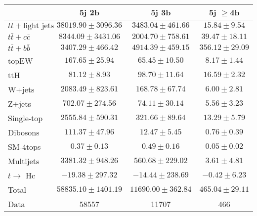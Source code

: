 \begin{table}
\begin{center}
  \begin{tabular}{ | l |  c |  c |  c | }
    \hline \hline 
     & 5j 2b  & 5j 3b  & 5j $\geq$4b  \\ 
    \hline 
     $t\bar{t}+\text{light jets}$  &   $ 38019.90 \pm 3096.36 $ &   $ 3483.04 \pm 461.66 $ &   $ 15.84 \pm 9.54 $ \\ 
     $t\bar{t}+c\bar{c}$  &   $ 8344.09 \pm 3431.06 $ &   $ 2004.70 \pm 758.61 $ &   $ 39.47 \pm 18.11 $ \\ 
     $t\bar{t}+b\bar{b}$  &   $ 3407.29 \pm 466.42 $ &   $ 4914.39 \pm 459.15 $ &   $ 356.12 \pm 29.09 $ \\ 
    topEW  &   $ 167.65 \pm 25.94 $ &   $ 65.45 \pm 10.50 $ &   $ 8.17 \pm 1.44 $ \\ 
    ttH  &   $ 81.12 \pm 8.93 $ &   $ 98.70 \pm 11.64 $ &   $ 16.59 \pm 2.32 $ \\ 
    W+jets  &   $ 2083.49 \pm 823.61 $ &   $ 168.78 \pm 67.74 $ &   $ 6.00 \pm 2.81 $ \\ 
    Z+jets  &   $ 702.07 \pm 274.56 $ &   $ 74.11 \pm 30.14 $ &   $ 5.56 \pm 3.23 $ \\ 
    Single-top  &   $ 2555.84 \pm 590.31 $ &   $ 321.66 \pm 89.64 $ &   $ 13.29 \pm 5.79 $ \\ 
    Dibosons  &   $ 111.37 \pm 47.96 $ &   $ 12.47 \pm 5.45 $ &   $ 0.76 \pm 0.39 $ \\ 
    SM-4tops  &   $ 0.37 \pm 0.13 $ &   $ 0.49 \pm 0.16 $ &   $ 0.05 \pm 0.02 $ \\ 
    Multijets  &   $ 3381.32 \pm 948.26 $ &   $ 560.68 \pm 229.02 $ &   $ 3.61 \pm 4.81 $ \\ 
     $t\rightarrow$ Hc  &   $ -19.38 \pm 297.32 $ &   $ -14.44 \pm 238.69 $ &   $ -0.42 \pm 6.23 $ \\ 
    Total  &   $ 58835.10 \pm 1401.19 $ &   $ 11690.00 \pm 362.84 $ &   $ 465.04 \pm 29.11 $ \\ 
    \hline 
    Data  & 58557  & 11707  & 466  \\ 
    \hline \hline 
  \end{tabular} 



\end{center}
\end{table}
